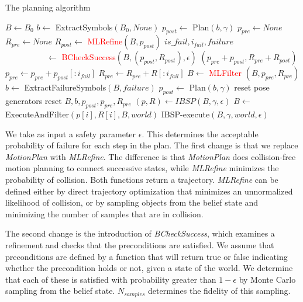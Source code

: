 \begin{algorithm}
 \caption{The \ibsp{} planning algorithm} \label{alg-ibsp}
 \begin{algorithmic}[1]
  \State $B \leftarrow B_0$
  \State $b \leftarrow $ ExtractSymbols$(B_0, None)$
  \State $p_{post} \leftarrow $ Plan$(b, \gamma)$
  \State $p_{pre} \leftarrow None$
  \State $R_{pre} \leftarrow None$
     \State $R_{post} \leftarrow $ \textcolor{red}{MLRefine}$(B, p_{post})$
     \State $is\_fail,i_{fail}, failure$\\\ \ \ \ \ \ \ \ \ \ $\leftarrow $ \textcolor{red}{BCheckSuccess}$(B, (p_{post}, R_{post}), \epsilon)$
         \State \Return $(p_{pre} + p_{post}, R_{pre} + R_{post})$
     \EndIf
     \State $p_{pre} \leftarrow p_{pre} + p_{post}[:i_{fail}]$
     \State $R_{pre} \leftarrow R_{pre} + R[:i_{fail}]$
     \State $B \leftarrow $ \textcolor{red}{MLFilter} $(B, p_{pre}, R_{pre})$
     \State $b\leftarrow $ ExtractFailureSymbols$(B, failure)$
     \State $p_{post} \leftarrow $ Plan$(b, \gamma)$     
        \State reset pose generators
        \State reset $B, b, p_{post}, p_{pre}, R_{pre}$
     \EndIf
  \EndWhile
  \EndProcedure
    \State $(p, R) \leftarrow IBSP(B, \gamma, \epsilon)$
      \State $B \leftarrow$ ExecuteAndFilter$(p[i], R[i], B, world)$
        \State \Return IBSP-execute$(B, \gamma, world, \epsilon)$
      \EndIf
    \EndFor
  \EndProcedure
 \end{algorithmic}
\end{algorithm}


We take as input a safety parameter $\epsilon$. This determines the
acceptable probability of failure for each step in the plan. The first
change is that we replace \emph{MotionPlan} with \emph{MLRefine}. The
difference is that \emph{MotionPlan} does collision-free motion
planning to connect successive states, while \emph{MLRefine} minimizes
the probability of collision. Both functions return a trajectory. \emph{MLRefine} can be defined either by
direct trajectory optimization that minimizes an unnormalized likelihood of collision,
or by sampling objects from the belief state and minimizing the number
of samples that are in collision.

The second change is the introduction of \emph{BCheckSuccess}, which examines a refinement and
checks that the preconditions
are satisfied. We assume that preconditions are defined by a function
that will return true or false indicating whether the precondition holds or not,
given a state of the world. We determine
that each of these is satisfied with probability greater than
$1-\epsilon$ by Monte Carlo sampling from the belief
state. $N_{samples}$ determines the fidelity of this sampling.

